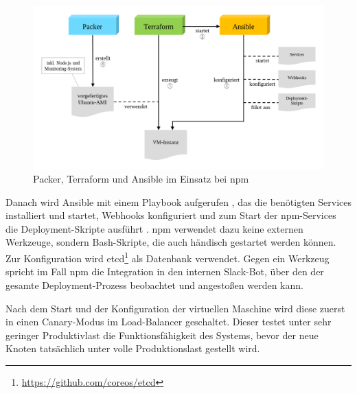 \begin{figure}[htbp]
    \centering
    \includegraphics[width=0.9\linewidth,clip]{images/npm-deployment}
    \caption{Packer, Terraform und Ansible im Einsatz bei npm}
\label{fig:configurationtools-npm}
\end{figure}

\noindent Danach wird Ansible mit einem Playbook aufgerufen , das die benötigten Services installiert und startet, Webhooks konfiguriert und zum Start der npm-Services die Deployment-Skripte ausführt .
npm verwendet dazu keine externen Werkzeuge, sondern Bash-Skripte, die auch händisch gestartet werden können.
Zur Konfiguration wird etcd\footnote{\url{https://github.com/coreos/etcd}} als Datenbank verwendet.
Gegen ein Werkzeug spricht im Fall npm die Integration in den internen Slack-Bot, über den der gesamte Deployment-Prozess beobachtet und angestoßen werden kann.

Nach dem Start und der Konfiguration der virtuellen Maschine wird diese zuerst in einen Canary-Modus im Load-Balancer geschaltet.
Dieser testet unter sehr geringer Produktivlast die Funktionsfähigkeit des Systems, bevor der neue Knoten tatsächlich unter volle Produktionslast gestellt wird.
